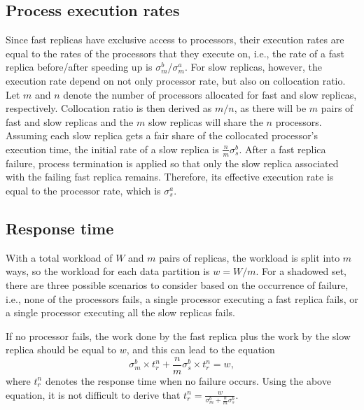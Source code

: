 \subsection{Process execution rates}
Since fast replicas have exclusive access to processors, their execution rates are equal to the rates of the processors that they execute on, i.e., the rate of a fast replica before/after speeding up is  $\sigma_{m}^{b}$/$\sigma_{m}^{a}$. For slow replicas, however, the execution rate depend on not only processor rate, but also on collocation ratio. Let $m$ and $n$ denote the number of processors allocated for fast and slow replicas, respectively. Collocation ratio is then derived as $m/n$, as there will be $m$ pairs of fast and slow replicas and the $m$ slow replicas will share the $n$ processors. Assuming each slow replica gets a fair share of the collocated processor's execution time, the initial rate of a slow replica is $\frac{n}{m}\sigma_{s}^{b}$. After a fast replica failure, process termination is applied so that only the slow replica associated with the failing fast replica remains. Therefore, its effective execution rate is equal to the processor rate, which is $\sigma_{s}^{a}$. 


\subsection{Response time}
\label{sec:res_time}
With a total workload of $W$ and $m$ pairs of replicas, the workload is split into $m$ ways, so the workload for each data partition is $w = W/m$.
For a shadowed set, there are three possible scenarios to consider based on the occurrence of failure, i.e., none of the processors fails, a single processor executing a fast replica fails, or a single processor executing all the slow replicas fails. %

If no processor fails, %
the work done by the fast replica plus the work by the slow replica should be equal to $w$, and this can lead to the equation $$\sigma_m^b \times t_r^n + \frac{n}{m}\sigma_s^b \times t_r^n = w,$$ where $t_r^n$ denotes the response time when no failure occurs. Using the above equation, it is not difficult to derive that $t_r^n = \frac{w}{\sigma_m^b+\frac{n}{m}\sigma_s^b}$.

